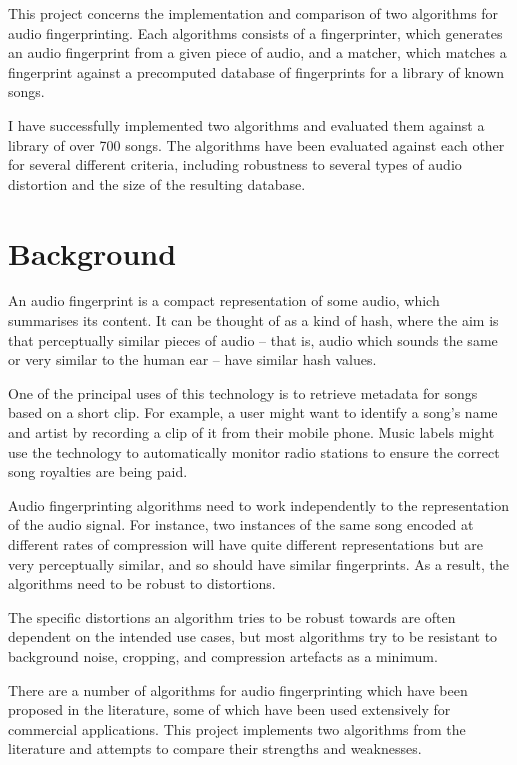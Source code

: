 \documentclass[12pt,a4paper,twoside,openright]{report}
\begin{document}
This project concerns the implementation and comparison of two algorithms for audio fingerprinting. Each algorithms consists of a fingerprinter, which generates an audio fingerprint from a given piece of audio, and a matcher, which matches a fingerprint against a precomputed database of fingerprints for a library of known songs.

I have successfully implemented two algorithms and evaluated them against a library of over 700 songs. The algorithms have been evaluated against each other for several different criteria, including robustness to several types of audio distortion and the size of the resulting database.


\section{Background}

An audio fingerprint is a compact representation of some audio, which summarises its content. It can be thought of as a kind of hash, where the aim is that perceptually similar pieces of audio -- that is, audio which sounds the same or very similar to the human ear -- have similar hash values.

One of the principal uses of this technology is to retrieve metadata for songs based on a short clip. For example, a user might want to identify a song's name and artist by recording a clip of it from their mobile phone. Music labels might use the technology to automatically monitor radio stations to ensure the correct song royalties are being paid.

Audio fingerprinting algorithms need to work independently to the representation of the audio signal. For instance, two instances of the same song encoded at different rates of compression will have quite different representations but are very perceptually similar, and so should have similar fingerprints. As a result, the algorithms need to be robust to distortions. 

The specific distortions an algorithm tries to be robust towards are often dependent on the intended use cases, but most algorithms try to be resistant to background noise, cropping, and compression artefacts as a minimum.

There are a number of algorithms for audio fingerprinting which have been proposed in the literature, some of which have been used extensively for commercial applications. This project implements two algorithms from the literature and attempts to compare their strengths and weaknesses.
\end{document}
